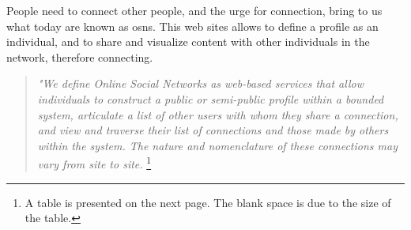
\indent \indent People need to connect other people, and the urge for connection, bring to us what today are known as \glspl{osn}.
This web sites allows to define a profile as an individual, and to share and visualize content with other individuals in the network, therefore connecting.

\begin{quote}
\textit{"We define Online Social Networks as web-based services that allow individuals to construct a public or semi-public
 profile within a bounded system, articulate a list of other users with whom they share a connection, and view and traverse
 their list of connections and those made by others within the system. The nature and nomenclature of these connections
 may vary from site to site.} \cite{ellison2007social} \footnote{A table is presented on the next page. The blank space is due to the size of the table.}
\end{quote}

